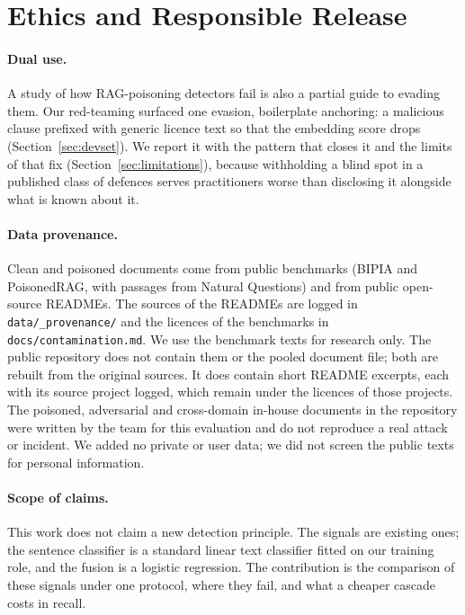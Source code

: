 \section{Ethics and Responsible Release}
\label{sec:ethics}

\paragraph{Dual use.}
A study of how RAG-poisoning detectors fail is also a partial guide to evading
them. Our red-teaming surfaced one evasion, boilerplate anchoring: a malicious
clause prefixed with generic licence text so that the embedding score drops
(Section~\ref{sec:devset}). We report it with the pattern that closes it and the
limits of that fix (Section~\ref{sec:limitations}), because withholding a blind
spot in a published class of defences serves practitioners worse than disclosing it
alongside what is known about it.

\paragraph{Data provenance.}
Clean and poisoned documents come from public benchmarks (BIPIA and PoisonedRAG,
with passages from Natural Questions) and from public open-source READMEs.
The sources of the READMEs are logged in \texttt{data/\_provenance/} and the
licences of the benchmarks in \texttt{docs/contamination.md}. We use the benchmark
texts for research only. The public repository does not contain them or the pooled
document file; both are rebuilt from the original sources. It does contain short
README excerpts, each with its source project logged, which remain under the
licences of those projects. The poisoned, adversarial and cross-domain in-house
documents in the repository were written by the team for this evaluation and do
not reproduce a real attack or incident. We added no private or user data; we did
not screen the public texts for personal information.

\paragraph{Scope of claims.}
This work does not claim a new detection principle. The signals are existing ones;
the sentence classifier is a standard linear text classifier fitted on our
training role, and the fusion is a logistic regression. The contribution is the
comparison of these signals under one protocol, where they fail, and what a
cheaper cascade costs in recall.

